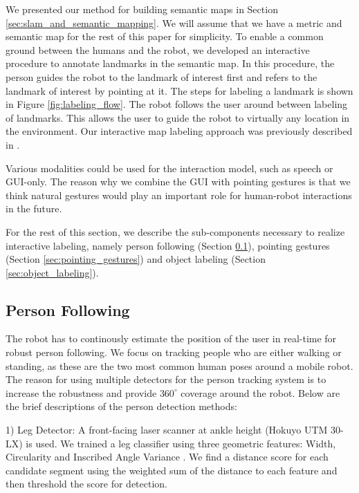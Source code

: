 \documentclass[3p]{elsarticle}
\begin{document}
We presented our method for building semantic maps in Section \ref{sec:slam_and_semantic_mapping}. We will assume that we have a metric and semantic map for the rest of this paper for simplicity. To enable a common ground between the humans and the robot, we developed an interactive procedure to annotate landmarks in the semantic map. In this procedure, the person guides the robot to the landmark of interest first and refers to the landmark of interest by pointing at it. The steps for labeling a landmark is shown in Figure \ref{fig:labeling_flow}. The robot follows the user around between labeling of landmarks. This allows the user to guide the robot to virtually any location in the environment. Our interactive map labeling approach was previously described in \cite{trevor2012interactive}.

Various modalities could be used for the interaction model, such as speech or GUI-only. The reason why we combine the GUI with pointing gestures is that we think natural gestures would play an important role for human-robot interactions in the future.

For the rest of this section, we describe the sub-components necessary to realize interactive labeling, namely person following (Section \ref{sec:person_following}), pointing gestures (Section \ref{sec:pointing_gestures}) and object labeling (Section \ref{sec:object_labeling}).

\subsection{Person Following}
\label{sec:person_following}

The robot has to continously estimate the position of the user in real-time for robust person following. We focus on tracking people who are either walking or standing, as these are the two most common human poses around a mobile robot. The reason for using multiple detectors for the person tracking system is to increase the robustness and provide $360^{\circ}$ coverage around the robot. Below are the brief descriptions of the person detection methods:

1) Leg Detector: A front-facing laser scanner at ankle height (Hokuyo UTM 30-LX) is used. We trained a leg classifier using three geometric features: Width, Circularity and Inscribed Angle Variance \cite{xavier2005fast}. We find a distance score for each candidate segment using the weighted sum of the distance to each feature and then threshold the score for detection.
\end{document}
